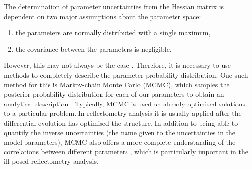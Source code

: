 \documentclass[
 reprint,
 superscriptaddress,
 amsmath,amssymb,
 aps,
]{revtex4-1}
\begin{document}
The determination of parameter uncertainties from the Hessian matrix is dependent on two major assumptions about the parameter space:
\begin{enumerate}
    \item {the parameters are normally distributed with a single maximum,}
    \item {the covariance between the parameters is negligible.}
\end{enumerate}
However, this may not always be the case \cite{mccluskey_bayesian_2019}. Therefore, it is necessary to use methods to completely describe the parameter probability distribution.
One such method for this is Markov-chain Monte Carlo (MCMC), which samples the posterior probability distribution for each of our parameters to obtain an analytical description \cite{sivia_data_2006}.
Typically, MCMC is used on already optimised solutions to a particular problem. In reflectometry analysis it is usually applied after the differential evolution has optimised the structure.
In addition to being able to quantify the inverse uncertainties (the name given to the uncertainties in the model parameters), MCMC also offers a more complete understanding of the correlations between different parameters \cite{gilks_markov_1995}, which is particularly important in the ill-posed reflectometry analysis.
\end{document}
